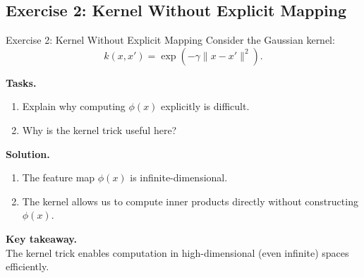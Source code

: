 \documentclass[aspectratio=169,11pt]{beamer}
\begin{document}
\subsection{Exercise 2: Kernel Without Explicit Mapping}
\begin{frame}[t,allowframebreaks]{Exercise 2: Kernel Without Explicit Mapping}
\small
Consider the Gaussian kernel:
\[
k(x,x') = \exp(-\gamma \|x - x'\|^2).
\]

\textbf{Tasks.}\\ \begin{enumerate}
    \item Explain why computing $\phi(x)$ explicitly is difficult.
    \item Why is the kernel trick useful here?
\end{enumerate}

\textbf{Solution.}\\ \begin{enumerate}
\item The feature map $\phi(x)$ is infinite-dimensional.

\item The kernel allows us to compute inner products directly without constructing $\phi(x)$.
\end{enumerate}

\textbf{Key takeaway.}\\ The kernel trick enables computation in high-dimensional (even infinite) spaces efficiently.
\end{frame}
\end{document}
